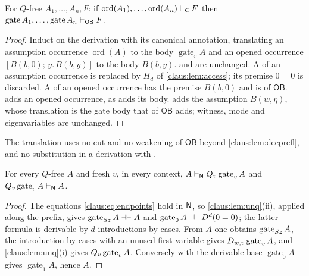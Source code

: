 \begin{theorem}
\label{claus:thm:ctob}
For $Q$-free $A_1,\dots,A_n,F$: if
$\operatorname{ord}(A_1),\dots,\operatorname{ord}(A_n)\vdash_{\mathsf{C}}F$
then
$\operatorname{gate}A_1,\dots,\operatorname{gate}A_n\vdash_{\mathsf{OB}}F$.
\end{theorem}
\begin{proof}
Induct on the derivation with its canonical annotation, translating an
assumption occurrence $\operatorname{ord}(A)$ to the body
$\operatorname{gate}_vA$ and an opened occurrence
$[B(b,0);\,y.\,B(b,y)]$ to the body $B(b,y)$.  and
 are unchanged. A  of an assumption
occurrence is replaced by $H_d$ of \cref{claus:lem:access}; its premise
$0=0$ is discarded. A  of an opened occurrence has the
premise $B(b,0)$ and is  of $\mathsf{OB}$.
 adds an opened occurrence, as  adds its
body.  adds the assumption $B(w,\eta)$, whose translation
is the gate body that  of $\mathsf{OB}$ adds; witness,
mode and eigenvariables are unchanged.
\end{proof}

The translation uses no cut and no weakening of $\mathsf{OB}$ beyond
\cref{claus:lem:deeprefl}, and no substitution in a derivation with
.

\begin{lemma}
\label{claus:lem:gatenat}
For every $Q$-free $A$ and fresh $v$, in every context,
$A\vdash_{\mathsf{N}}Q_{v}\operatorname{gate}_vA$ and
$Q_{v}\operatorname{gate}_vA\vdash_{\mathsf{N}}A$.
\end{lemma}
\begin{proof}
The equations \eqref{claus:eq:endpoints} hold in $\mathsf{N}$, so
\cref{claus:lem:unq}(ii), applied along the prefix, gives
$\operatorname{gate}_{S z}A\dashv\vdash A$ and
$\operatorname{gate}_0A\dashv\vdash D^d(0=0)$; the latter formula is
derivable by $d$ introductions by cases. From $A$ one obtains
$\operatorname{gate}_{S z}A$, the introduction by cases with an unused
first variable gives $D_{w,v}\operatorname{gate}_vA$, and
\cref{claus:lem:unq}(i) gives $Q_{v}\operatorname{gate}_vA$. Conversely 
with the derivable base $\operatorname{gate}_0A$ gives
$\operatorname{gate}_1A$, hence $A$.
\end{proof}

